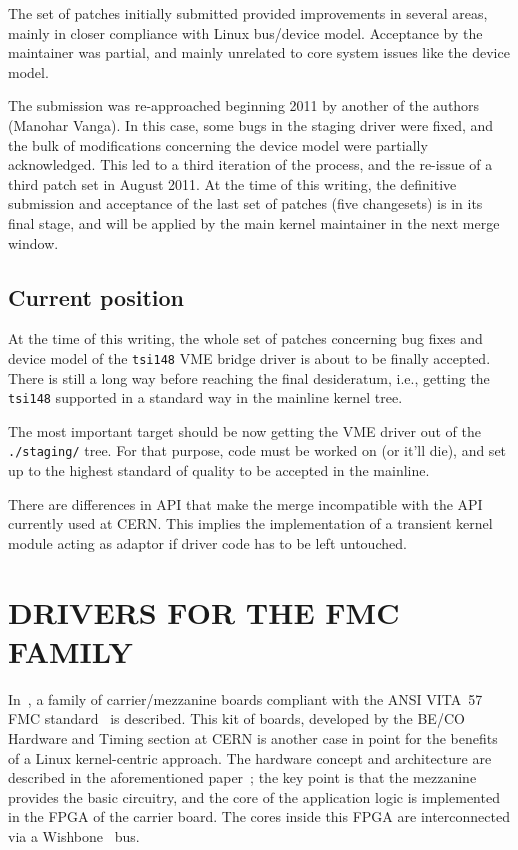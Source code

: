 \documentclass{JAC2003}
\begin{document}
The set of patches initially submitted provided improvements in several
areas, mainly in closer compliance with Linux bus/device model.
Acceptance by the maintainer was partial, and mainly unrelated to core
system issues like the device model.

The submission was re-approached beginning 2011 by another of the
authors (Manohar Vanga). In this case, some bugs in the staging driver
were fixed, and the bulk of modifications concerning the device model
were partially acknowledged. This led to a third iteration of the
process, and the re-issue of a third patch set in August 2011. At the
time of this writing, the definitive submission and acceptance of the
last set of patches (five changesets) is in its final stage, and
will be applied by the main kernel maintainer in the next merge window.

\subsection{Current position}

At the time of this writing, the whole set of patches concerning bug
fixes and device model of the \verb|tsi148| VME bridge driver is
about to be finally accepted. There is still a long way before reaching
the final desideratum, i.e., getting the \verb|tsi148|
supported in a standard way in the mainline kernel tree.
\begin{Itemize}
\item The most important target should be now getting the VME driver out
of the \verb|./staging/| tree. For that purpose, code must be worked on
(or it'll die), and set up to the highest standard of quality to be
accepted in the mainline.
\item There are differences in API that make the merge incompatible with
the API currently used at CERN. This implies the implementation of
a transient 
kernel module acting as adaptor if driver code has to be left untouched.
\end{Itemize}

\section{DRIVERS FOR THE FMC FAMILY}

In~\cite{fpga-fmc}, a family of carrier/mezzanine boards compliant with the ANSI VITA~57 FMC standard~\cite{} is described. This kit of boards,
developed by the BE/CO Hardware and Timing section at CERN is
another case in point for the benefits of a Linux kernel-centric
approach. The hardware concept and architecture are described
in the aforementioned paper~\cite{fpga-fmc}; the key point is that the
mezzanine provides the basic circuitry, and the core of the application
logic is implemented in the FPGA of the carrier board. The cores inside
this FPGA are interconnected via a Wishbone~\cite{wishbone-spec} bus.
\end{document}
